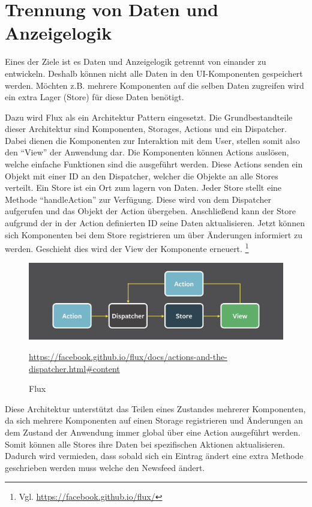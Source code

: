 \section{Trennung von Daten und Anzeigelogik}
Eines der Ziele ist es Daten und Anzeigelogik getrennt von einander zu entwickeln. 
Deshalb können nicht alle Daten in den UI-Komponenten gespeichert werden. Möchten z.B. mehrere Komponenten auf die selben 
Daten zugreifen wird ein extra Lager (Store) für diese Daten benötigt.

Dazu wird Flux als ein Architektur Pattern eingesetzt.
Die Grundbestandteile dieser Architektur sind Komponenten, Storages, Actions und ein Dispatcher.
Dabei dienen die Komponenten zur Interaktion mit dem User, stellen somit also den \enquote{View} der Anwendung dar.
Die Komponenten können Actions auslösen, welche einfache Funktionen sind die ausgeführt werden.
Diese Actions senden ein Objekt mit einer ID an den Dispatcher, welcher die Objekte an alle Stores verteilt.
Ein Store ist ein Ort zum lagern von Daten. Jeder Store stellt eine Methode \enquote{handleAction} zur Verfügung.
Diese wird von dem Dispatcher aufgerufen und das Objekt der Action übergeben. 
Anschließend kann der Store aufgrund der in der Action definierten ID seine Daten aktualisieren.
Jetzt können sich Komponenten bei dem Store registrieren um über Änderungen informiert zu werden.
Geschieht dies wird der View der Komponente erneuert. \footnote{Vgl. \url{https://facebook.github.io/flux/}}
\begin{figure}[H]
    \includegraphics[width=\textwidth]{images/flux.png}
    \caption{Flux}
    \url{https://facebook.github.io/flux/docs/actions-and-the-dispatcher.html#content}
\end{figure}

Diese Architektur unterstützt das Teilen eines Zustandes mehrerer Komponenten, da sich mehrere Komponenten auf einen Storage registrieren 
und Änderungen an dem Zustand der Anwendung immer global über eine Action ausgeführt werden. Somit können alle Stores ihre Daten bei spezifischen Aktionen aktualisieren.
Dadurch wird vermieden, dass sobald sich ein Eintrag ändert eine extra Methode geschrieben werden muss welche den Newsfeed ändert.

